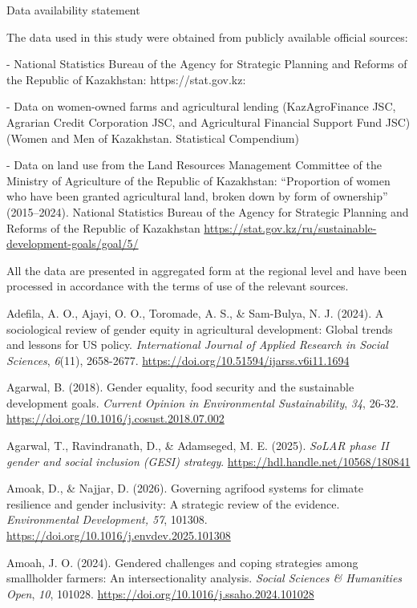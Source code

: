 \documentclass[
]{article}
\begin{document}
Data availability statement

The data used in this study were obtained from publicly available
official sources:

- National Statistics Bureau of the Agency for Strategic Planning and
Reforms of the Republic of Kazakhstan: https://stat.gov.kz:

- Data on women-owned farms and agricultural lending (KazAgroFinance
JSC, Agrarian Credit Corporation JSC, and Agricultural Financial Support
Fund JSC) (Women and Men of Kazakhstan. Statistical Compendium)

- Data on land use from the Land Resources Management Committee of the
Ministry of Agriculture of the Republic of Kazakhstan: ``Proportion of
women who have been granted agricultural land, broken down by form of
ownership'' (2015--2024). National Statistics Bureau of the Agency for
Strategic Planning and Reforms of the Republic of Kazakhstan
\url{https://stat.gov.kz/ru/sustainable-development-goals/goal/5/}

All the data are presented in aggregated form at the regional level and
have been processed in accordance with the terms of use of the relevant
sources.

Adefila, A. O., Ajayi, O. O., Toromade, A. S., \& Sam-Bulya, N. J.
(2024). A sociological review of gender equity in agricultural
development: Global trends and lessons for US policy.
\emph{International Journal of Applied Research in Social Sciences},
\emph{6}(11), 2658-2677.
\url{https://doi.org/10.51594/ijarss.v6i11.1694}

Agarwal, B. (2018). Gender equality, food security and the sustainable
development goals. \emph{Current Opinion in Environmental
Sustainability}, \emph{34}, 26-32.
\url{https://doi.org/10.1016/j.cosust.2018.07.002}

Agarwal, T., Ravindranath, D., \& Adamseged, M. E. (2025). \emph{SoLAR
phase II gender and social inclusion (GESI) strategy}.
\url{https://hdl.handle.net/10568/180841}

Amoak, D., \& Najjar, D. (2026). Governing agrifood systems for climate
resilience and gender inclusivity: A strategic review of the evidence.
\emph{Environmental Development, 57}, 101308.
\url{https://doi.org/10.1016/j.envdev.2025.101308}

Amoah, J. O. (2024). Gendered challenges and coping strategies among
smallholder farmers: An intersectionality analysis. \emph{Social
Sciences \& Humanities Open}, \emph{10}, 101028.
\url{https://doi.org/10.1016/j.ssaho.2024.101028}
\end{document}

